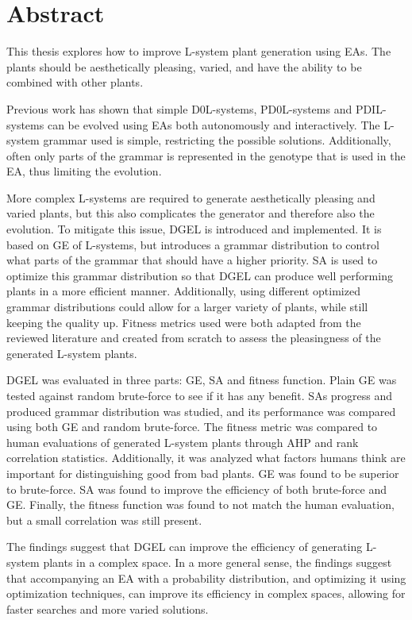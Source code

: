 \chapter*{Abstract}

This thesis explores how to improve L-system plant generation using \glspl{EA}.
The plants should be aesthetically pleasing, varied, and have the ability to be combined with other plants.

Previous work has shown that simple \glspl{D0L-system}, \glspl{PD0L-system} and \glspl{PDIL-system} can be evolved using \glspl{EA} both autonomously and interactively.
The \gls{L-system} grammar used is simple, restricting the possible solutions.
Additionally, often only parts of the grammar is represented in the genotype that is used in the \gls{EA}, thus limiting the evolution.

More complex \glspl{L-system} are required to generate aesthetically pleasing and varied plants, but this also complicates the generator and therefore also the evolution.
To mitigate this issue, \gls{DGEL} is introduced and implemented.
It is based on \gls{GE} of \glspl{L-system}, but introduces a grammar distribution to control what parts of the grammar that should have a higher priority.
\Gls{SA} is used to optimize this grammar distribution so that \gls{DGEL} can produce well performing plants in a more efficient manner.
Additionally, using different optimized grammar distributions could allow for a larger variety of plants, while still keeping the quality up.
Fitness metrics used were both adapted from the reviewed literature and created from scratch to assess the pleasingness of the generated L-system plants.

\Gls{DGEL} was evaluated in three parts: \gls{GE}, \gls{SA} and fitness function.
Plain \gls{GE} was tested against random brute-force to see if it has any benefit.
\Gls{SA}s progress and produced grammar distribution was studied, and its performance was compared using both \gls{GE} and random brute-force.
The fitness metric was compared to human evaluations of generated L-system plants through \gls{AHP} and rank correlation statistics.
Additionally, it was analyzed what factors humans think are important for distinguishing good from bad plants.
\Gls{GE} was found to be superior to brute-force.
\Gls{SA} was found to improve the efficiency of both brute-force and \gls{GE}.
Finally, the fitness function was found to not match the human evaluation, but a small correlation was still present.

The findings suggest that \gls{DGEL} can improve the efficiency of generating L-system plants in a complex space. In a more general sense, the findings suggest that accompanying an EA with a probability distribution, and optimizing it using optimization techniques, can improve its efficiency in complex spaces, allowing for faster searches and more varied solutions.

\hypersetup{pageanchor=false}
